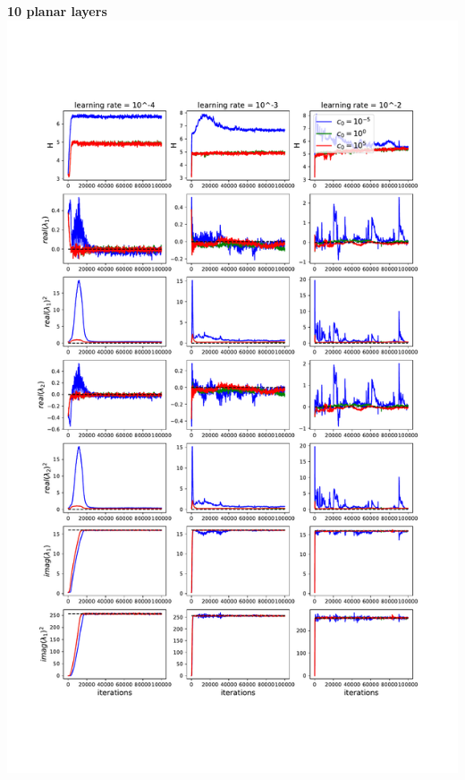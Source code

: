 \documentclass[11pt]{article}
\begin{document}
\clearpage
\begin{center}
\textbf{10 planar layers} \\
\includegraphics[scale=.45]{images/learnA_10P.pdf} \\
\end{center}
\end{document}
